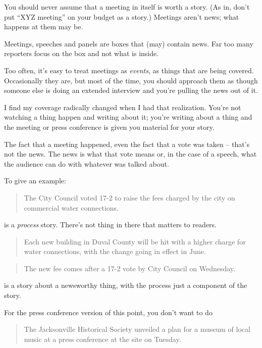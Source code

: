 \documentclass[
  12pt,
  american,
  letterpaperpaper,
  extrafontsizes,onecolumn,openright
  ]{memoir}
\begin{document}
You should never assume that a meeting in itself is worth a story. (As in, don't put \enquote{XYZ meeting} on your budget as a story.) Meetings aren't news; what happens at them may be.

Meetings, speeches and panels are boxes that (may) contain news. Far too many reporters focus on the box and not what is inside.

Too often, it's easy to treat meetings as \emph{events}, as things that are being covered. Occasionally they are, but most of the time, you should approach them as though someone else is doing an extended interview and you're pulling the news out of it.

I find my coverage radically changed when I had that realization. You're not watching a thing happen and writing about it; you're writing about a thing and the meeting or press conference is given you material for your story.

The fact that a meeting happened, even the fact that a vote was taken -- that's not the news. The news is what that vote means or, in the case of a speech, what the audience can do with whatever was talked about.

To give an example:

\begin{quote}
The City Council voted 17-2 to raise the fees charged by the city on commercial water connections.
\end{quote}

is a \emph{process} story. There's not thing in there that matters to readers.

\begin{quote}
Each new building in Duval County will be hit with a higher charge for water connections, with the change going in effect in June.
\end{quote}

\begin{quote}
The new fee comes after a 17-2 vote by City Council on Wednesday.
\end{quote}

is a story about a newsworthy thing, with the process just a component of the story.

For the press conference version of this point, you don't want to do

\begin{quote}
The Jacksonville Historical Society unveiled a plan for a museum of local music at a press conference at the site on Tuesday.
\end{quote}
\end{document}
